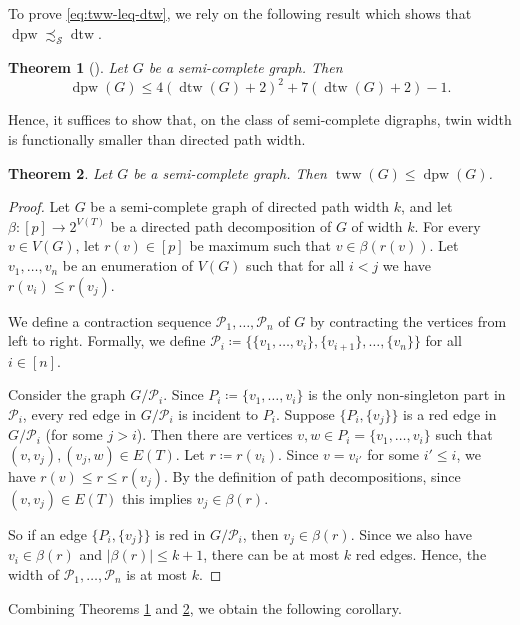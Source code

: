 \PassOptionsToPackage{dvipsnames,svgnames}{xcolor}\documentclass[10pt,a4paper]{article}
\newtheorem{theorem}{Theorem}[section]
\newcommand{\CP}{{\mathcal P}}
\newcommand{\CS}{{\mathcal S}}
\DeclareMathOperator{\dtw}{dtw}
\DeclareMathOperator{\tww}{tww}
\DeclareMathOperator{\dpw}{dpw}
\begin{document}
To prove \eqref{eq:tww-leq-dtw}, we rely on the following result which shows that $\dpw\precsim_{\CS}\dtw$.

\begin{theorem}[{\cite[Proposition 5]{GurskiKRW21}}]
 \label{thm:dpw-vs-dtw}
 Let $G$ be a semi-complete graph.
 Then
 \[\dpw(G) \leq 4(\dtw(G) + 2)^2 + 7(\dtw(G) + 2) - 1.\]
\end{theorem}

Hence, it suffices to show that, on the class of semi-complete digraphs, twin width is functionally smaller than directed path width.

\begin{theorem}
 \label{thm:tww-vs-dpw}
 Let $G$ be a semi-complete graph.
 Then $\tww(G) \leq \dpw(G)$.
\end{theorem}

\begin{proof}
 Let $G$ be a semi-complete graph of directed path width $k$, and let $\beta\colon [p] \to 2^{V(T)}$ be a directed path decomposition of $G$ of width $k$.
 For every $v \in V(G)$, let $r(v) \in [p]$ be maximum such that $v \in \beta(r(v))$.
 Let $v_1,\dots,v_n$ be an enumeration of $V(G)$ such that for all $i < j$ we have $r(v_i) \leq r(v_j)$.

 We define a contraction sequence $\CP_1,\dots,\CP_n$ of $G$ by contracting the vertices from left to right.
 Formally, we define $\CP_i \coloneqq \{\{v_1,\dots,v_i\},\{v_{i+1}\},\dots,\{v_n\}\}$ for all $i \in [n]$.

 Consider the graph $G/\CP_i$.
 Since $P_i \coloneqq \{v_1,\dots,v_i\}$ is the only non-singleton part in $\CP_i$, every red edge in $G/\CP_i$ is incident to $P_i$.
 Suppose $\{P_i,\{v_j\}\}$ is a red edge in $G/\CP_i$ (for some $j > i$).
 Then there are vertices $v,w \in P_i = \{v_1,\dots,v_i\}$ such that $(v,v_j),(v_j,w) \in E(T)$.
 Let $r\coloneqq r(v_i)$.
 Since $v = v_{i'}$ for some $i'\leq i$, we have $r(v) \leq r \leq r(v_j)$.
 By the definition of path decompositions, since $(v,v_j) \in E(T)$ this implies $v_j \in \beta(r)$.

 So if an edge $\{P_i,\{v_j\}\}$ is red in $G/\CP_i$, then $v_j \in \beta(r)$.
 Since we also have $v_i \in \beta(r)$ and $|\beta(r)| \leq k+1$, there can be at most $k$ red edges.
 Hence, the width of $\CP_1,\dots,\CP_n$ is at most $k$.
\end{proof}

Combining Theorems \ref{thm:dpw-vs-dtw} and \ref{thm:tww-vs-dpw}, we obtain the following corollary.
\end{document}
